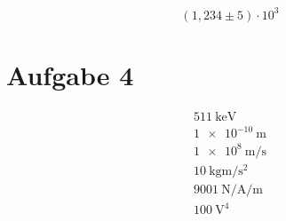 \documentclass{scrartcl}
\begin{document}
\begin{equation}
  (1{,}234 \pm 5) \cdot 10^3
\end{equation}

\section*{Aufgabe 4}

\begin{gather}
  \SI{511}{\kilo\electronvolt} \\
  \SI{1e-10}{\metre} \\
  \SI{1e8}{\metre\per\second} \\
  \SI{10}{\kilo\gram\metre\per\square\second} \\
  \SI{9001}{\newton\per\ampere\per\metre} \\
  \SI{100}{\volt\tothe{4}}
\end{gather}
\end{document}
